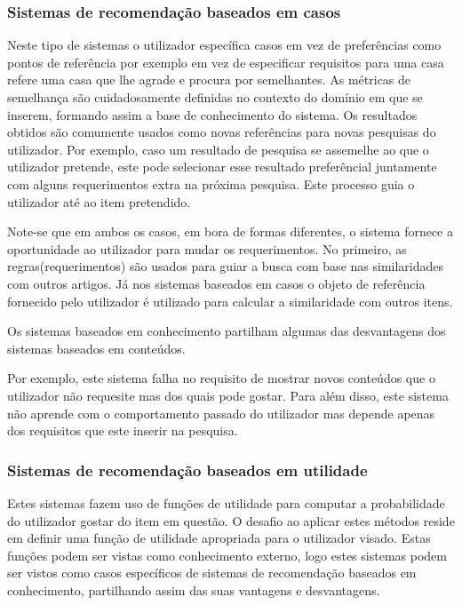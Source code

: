 \subsubsection{Sistemas de recomendação baseados em casos}
\hfill
\par Neste tipo de sistemas o utilizador específica casos  em vez de preferências como pontos de referência por exemplo em vez de especificar requisitos para uma casa refere uma casa que lhe agrade e procura por semelhantes. As métricas de semelhança são cuidadosamente definidas no contexto do domínio em que se inserem, formando assim a base de conhecimento do sistema. Os resultados obtidos são comumente usados como novas referências para novas pesquisas do utilizador.  Por exemplo, caso um resultado de pesquisa se assemelhe ao que o utilizador pretende, este pode selecionar esse resultado preferêncial juntamente com alguns requerimentos extra na próxima pesquisa. Este processo guia o utilizador até ao item pretendido.
\par Note-se que em ambos os casos, em bora de formas diferentes, o sistema fornece a oportunidade ao utilizador para mudar os requerimentos.
No primeiro, as regras(requerimentos) são usados para guiar a busca com base nas similaridades com outros artigos. Já nos sistemas baseados em casos o objeto de referência fornecido pelo utilizador é utilizado para calcular a similaridade com outros itens.
\par Os sistemas baseados em conhecimento partilham algumas das desvantagens dos sistemas baseados em conteúdos. 
\par Por exemplo, este sistema falha no requisito de mostrar novos conteúdos que o utilizador não requesite mas dos quais pode gostar.
Para além disso, este sistema não aprende com o comportamento passado do utilizador mas depende apenas dos requisitos que este inserir na pesquisa.

\hfill
\subsubsection{Sistemas de recomendação baseados em utilidade}
\hfill
\par Estes sistemas fazem uso de funções de utilidade para computar a probabilidade do utilizador gostar do item em questão. O desafio ao aplicar estes métodos reside em definir uma função de utilidade apropriada para o utilizador visado. Estas funções podem ser vistas como conhecimento externo, logo estes sistemas podem ser vistos como casos específicos de sistemas de recomendação baseados em conhecimento, partilhando assim das suas vantagens e desvantagens.

